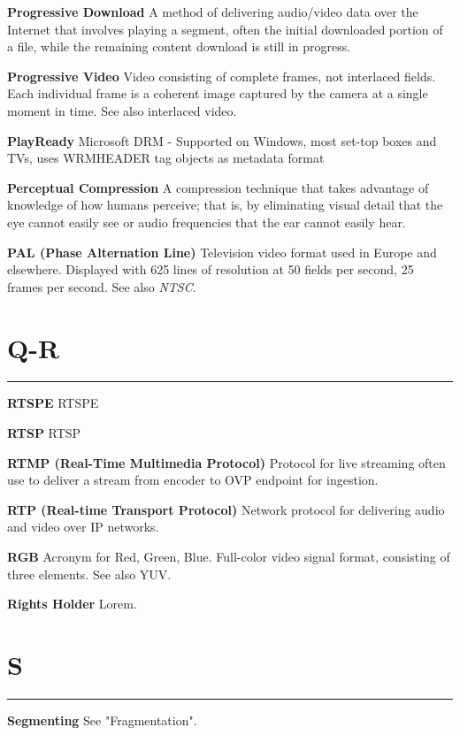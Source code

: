 \smallskip
\textbf{Progressive Download}
A method of delivering audio/video data over the Internet that involves playing a segment, often the initial downloaded portion of a file, while the remaining content download is still in progress.

\smallskip
\textbf{Progressive Video}
Video consisting of complete frames, not interlaced fields. Each individual frame is a coherent image captured by the camera at a single moment in time. See also interlaced video.

\smallskip
\textbf{PlayReady}
Microsoft DRM - Supported on Windows, most set-top boxes and TVs, uses WRMHEADER tag objects as metadata format

\smallskip
\textbf{Perceptual Compression}
A compression technique that takes advantage of knowledge of how humans perceive; that is, by eliminating visual detail that the eye cannot easily see or audio frequencies that the ear cannot easily hear.

\smallskip
\textbf{PAL (Phase Alternation Line)}
Television video format used in Europe and elsewhere. Displayed with 625 lines of resolution at 50 fields per second, 25 frames per second. See also \textit{NTSC}.


\section{Q-R}
\hrule

\smallskip
\textbf{RTSPE}
RTSPE

\smallskip
\textbf{RTSP}
RTSP

\smallskip
\textbf{RTMP (Real-Time Multimedia Protocol)}
Protocol for live streaming often use to deliver a stream from encoder to OVP endpoint for ingestion.

\smallskip
\textbf{RTP (Real-time Transport Protocol)}
Network protocol for delivering audio and video over IP networks.

\smallskip
\textbf{RGB}
Acronym for Red, Green, Blue. Full-color video signal format, consisting of three elements. See also YUV.

\smallskip
\textbf{Rights Holder}
Lorem.

\section{S}
\hrule

\smallskip
\textbf{Segmenting}
See "Fragmentation".

